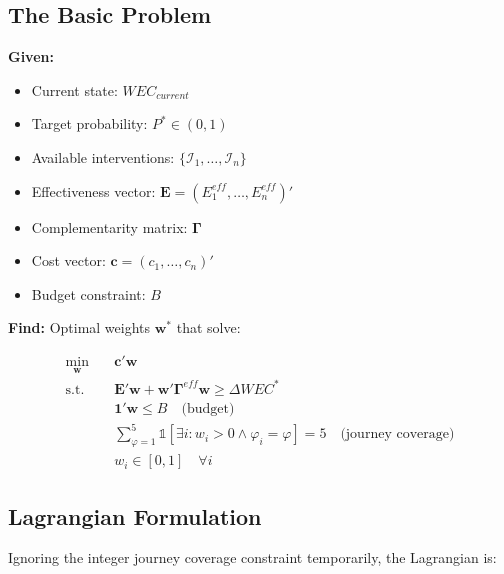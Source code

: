 \subsection{The Basic Problem}

\begin{tcolorbox}[colback=green!5!white, colframe=green!75!black,
    title=The Minimum Effective Portfolio Problem]

\textbf{Given:}
\begin{itemize}[nosep]
\item Current state: $WEC_{current}$
\item Target probability: $P^* \in (0, 1)$
\item Available interventions: $\{\mathcal{I}_1, \ldots, \mathcal{I}_n\}$
\item Effectiveness vector: $\mathbf{E} = (E_1^{eff}, \ldots, E_n^{eff})'$
\item Complementarity matrix: $\boldsymbol{\Gamma}$
\item Cost vector: $\mathbf{c} = (c_1, \ldots, c_n)'$
\item Budget constraint: $B$
\end{itemize}

\textbf{Find:} Optimal weights $\mathbf{w}^*$ that solve:

\begin{equation}
\boxed{
\begin{aligned}
\min_{\mathbf{w}} \quad & \mathbf{c}'\mathbf{w} \\[6pt]
\text{s.t.} \quad & \mathbf{E}'\mathbf{w} + \mathbf{w}'\boldsymbol{\Gamma}^{eff}\mathbf{w} \geq \Delta WEC^* \\[3pt]
& \mathbf{1}'\mathbf{w} \leq B \quad \text{(budget)} \\[3pt]
& \sum_{\varphi=1}^{5} \mathbb{1}[\exists i: w_i > 0 \land \varphi_i = \varphi] = 5 \quad \text{(journey coverage)} \\[3pt]
& w_i \in [0, 1] \quad \forall i
\end{aligned}
}
\label{eq:mep-full}
\end{equation}
\end{tcolorbox}

\subsection{Lagrangian Formulation}

Ignoring the integer journey coverage constraint temporarily, the Lagrangian is:

